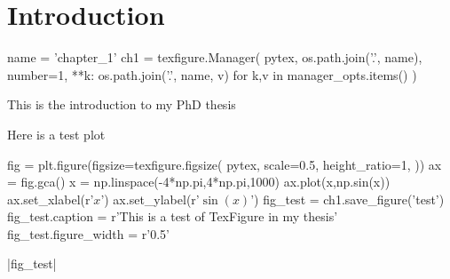 \chapter{Introduction}\label{ch:introduction}

\begin{pycode}[chapter_1]
name = 'chapter_1'
ch1 = texfigure.Manager(
    pytex,
    os.path.join('.', name),
    number=1,
    **{k: os.path.join('.', name, v) for k,v in manager_opts.items()}
)
\end{pycode}

This is the introduction to my PhD thesis

\citet{bradshaw_cooling_2010} %

Here is a test plot

\begin{pycode}[chapter_1]
fig = plt.figure(figsize=texfigure.figsize(
    pytex,
    scale=0.5,
    height_ratio=1,
))
ax = fig.gca()
x = np.linspace(-4*np.pi,4*np.pi,1000)
ax.plot(x,np.sin(x))
ax.set_xlabel(r'$x$')
ax.set_ylabel(r'$\sin{(x)}$')
fig_test = ch1.save_figure('test')
fig_test.caption = r'This is a test of TexFigure in my thesis'
fig_test.figure_width = r'0.5\columnwidth'
\end{pycode}
\py[chapter_1]|fig_test|

